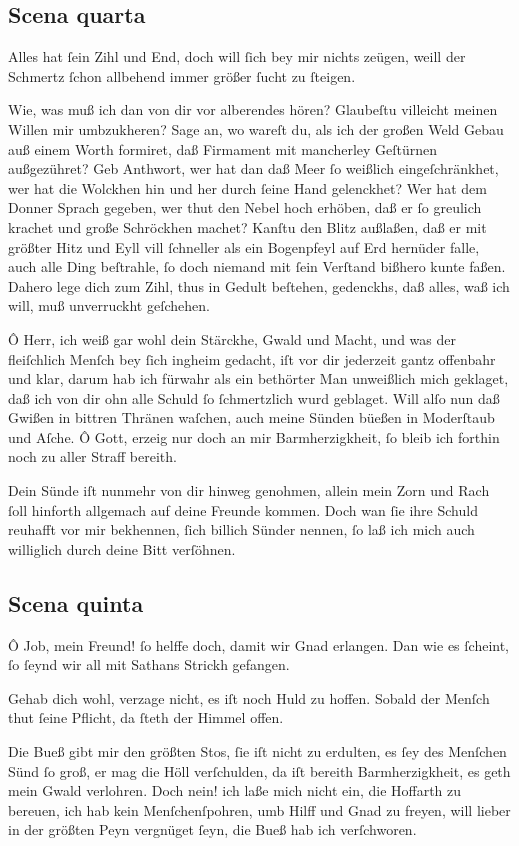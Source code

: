 \documentclass{ees}
\newenvironment{lyrics}[1]{%
  \subsection{#1}\nopagebreak%
  \begin{lyricslist}%
  \let\voice\item%
}{%
  \end{lyricslist}%
}
\begin{document}
\begin{lyrics}{Scena quarta}
  \voice[Job]
  Alles hat ſein Zihl und End,
  doch will ſich bey mir nichts zeügen,
  weill der Schmertz ſchon allbehend
  immer größer ſucht zu ſteigen.

  \voice[Schöpffer]
  Wie, was muß ich dan von dir
  vor alberendes hören?
  Glaubeſtu villeicht
  meinen Willen mir umbzukheren?
  Sage an, wo wareſt du,
  als ich der großen Weld Gebau
  auß einem Worth formiret,
  daß Firmament mit mancherley Geſtürnen außgezühret?
  Geb Anthwort, wer hat dan daß Meer
  ſo weißlich eingeſchränkhet,
  wer hat die Wolckhen hin und her
  durch ſeine Hand gelenckhet?
  Wer hat dem Donner Sprach gegeben,
  wer thut den Nebel hoch erhöben,
  daß er ſo greulich krachet
  und große Schröckhen machet?
  Kanſtu den Blitz außlaßen,
  daß er mit größter Hitz und Eyll
  vill ſchneller als ein Bogenpfeyl
  auf Erd hernüder falle,
  auch alle Ding beſtrahle,
  ſo doch niemand mit ſein Verſtand
  bißhero kunte faßen.
  Dahero lege dich zum Zihl,
  thus in Gedult beſtehen,
  gedenckhs, daß alles, waß ich will,
  muß unverruckht geſchehen.

  \voice[Job]
  Ô Herr, ich weiß gar wohl
  dein Stärckhe, Gwald und Macht,
  und was der fleiſchlich Menſch
  bey ſich ingheim gedacht,
  iſt vor dir jederzeit
  gantz offenbahr und klar,
  darum hab ich fürwahr
  als ein bethörter Man
  unweißlich mich geklaget,
  daß ich von dir ohn alle Schuld
  ſo ſchmertzlich wurd geblaget.
  Will alſo nun daß Gwißen
  in bittren Thränen waſchen,
  auch meine Sünden büeßen
  in Moderſtaub und Aſche.
  Ô Gott, erzeig
  nur doch an mir Barmherzigkheit,
  ſo bleib ich forthin noch
  zu aller Straff bereith.

  \voice[Schöpffer]
  Dein Sünde iſt nunmehr
  von dir hinweg genohmen,
  allein mein Zorn und Rach
  ſoll hinforth allgemach
  auf deine Freunde kommen.
  Doch wan ſie ihre Schuld
  reuhafft vor mir bekhennen,
  ſich billich Sünder nennen,
  ſo laß ich mich
  auch williglich
  durch deine Bitt verſöhnen.
\end{lyrics}

\begin{lyrics}{Scena quinta}
  \voice[Eliphas]
  Ô Job, mein Freund! ſo helffe doch,
  damit wir Gnad erlangen.
  Dan wie es ſcheint, ſo ſeynd wir all
  mit Sathans Strickh gefangen.

  \voice[Job]
  Gehab dich wohl, verzage nicht,
  es iſt noch Huld zu hoffen.
  Sobald der Menſch thut ſeine Pflicht,
  da ſteth der Himmel offen.

  \voice[Leviathan]
  Die Bueß gibt mir den größten Stos,
  ſie iſt nicht zu erdulten,
  es ſey des Menſchen Sünd ſo groß,
  er mag die Höll verſchulden,
  da iſt bereith Barmherzigkheit,
  es geth mein Gwald verlohren.
  Doch nein!
  ich laße mich nicht ein,
  die Hoffarth zu bereuen,
  ich hab kein Menſchenſpohren,
  umb Hilff und Gnad zu freyen,
  will lieber in der größten Peyn
  vergnüget ſeyn,
  die Bueß hab ich verſchworen.
\end{lyrics}

\end{document}
